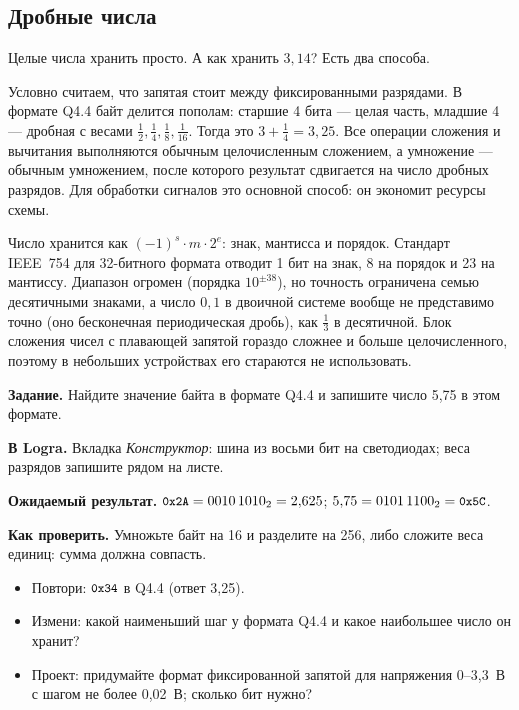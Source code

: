 \subsection{Дробные числа}

Целые числа хранить просто. А как хранить $3{,}14$? Есть два способа.

 Условно считаем, что запятая стоит
между фиксированными разрядами. В формате Q4.4 байт делится пополам: старшие
4 бита --- целая часть, младшие 4 --- дробная с весами $\tfrac12, \tfrac14,
\tfrac18, \tfrac1{16}$. Тогда  это $3 + \tfrac14 = 3{,}25$. Все
операции сложения и вычитания выполняются обычным целочисленным сложением, а
умножение --- обычным умножением, после которого результат сдвигается на
число дробных разрядов. Для обработки сигналов это основной способ: он
экономит ресурсы схемы.

 Число хранится как $(-1)^s \cdot m \cdot
2^{e}$: знак, мантисса и порядок. Стандарт IEEE~754 для 32-битного формата
 отводит 1 бит на знак, 8 на порядок и 23 на мантиссу. Диапазон
огромен (порядка $10^{\pm 38}$), но точность ограничена семью десятичными
знаками, а число $0{,}1$ в двоичной системе вообще не представимо точно (оно
бесконечная периодическая дробь), как $\tfrac13$ в десятичной. Блок
сложения чисел с плавающей запятой гораздо сложнее и больше целочисленного,
поэтому в небольших устройствах его стараются не использовать.

\begin{diybox}
\textbf{Задание.} Найдите значение байта  в формате Q4.4 и
запишите число 5,75 в этом формате.\par
\textbf{В Logra.} Вкладка \emph{Конструктор}: шина из восьми бит на
светодиодах; веса разрядов запишите рядом на листе.\par
\textbf{Ожидаемый результат.} $\texttt{\small 0x2A}=0010\,1010_2=2{,}625$;
$5{,}75=0101\,1100_2=\texttt{\small 0x5C}$.\par
\textbf{Как проверить.} Умножьте байт на 16 и разделите на 256, либо
сложите веса единиц: сумма должна совпасть.
\begin{itemize}[leftmargin=3.4em,labelwidth=3em,labelsep=0.4em,align=left]
  \item[\stars{1}] Повтори: $\texttt{\small 0x34}$ в Q4.4 (ответ 3,25).
  \item[\stars{2}] Измени: какой наименьший шаг у формата Q4.4 и какое наибольшее
    число он хранит?
  \item[\stars{3}] Проект: придумайте формат фиксированной запятой для напряжения
    0--3,3~В с шагом не более 0,02~В; сколько бит нужно?
\end{itemize}
\end{diybox}

